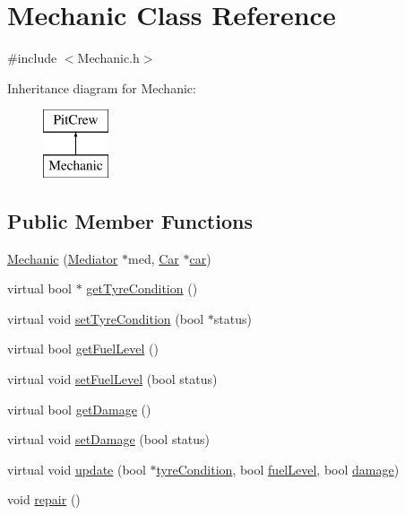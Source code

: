 \hypertarget{class_mechanic}{}\section{Mechanic Class Reference}
\label{class_mechanic}


{\ttfamily \#include $<$Mechanic.\+h$>$}

Inheritance diagram for Mechanic\+:\begin{figure}[H]
\begin{center}
\leavevmode
\includegraphics[height=2.000000cm]{class_mechanic}
\end{center}
\end{figure}
\subsection*{Public Member Functions}
\begin{DoxyCompactItemize}
\item 
\mbox{\hyperlink{class_mechanic_a919f634b4363111e9e17b2c6dd29b9c8}{Mechanic}} (\mbox{\hyperlink{class_mediator}{Mediator}} $\ast$med, \mbox{\hyperlink{class_car}{Car}} $\ast$\mbox{\hyperlink{class_pit_crew_ae2d97d82c1ae7061faf9b053329772e5}{car}})
\item 
virtual bool $\ast$ \mbox{\hyperlink{class_mechanic_aed7f46c76c75b647527c041ff5082f6e}{get\+Tyre\+Condition}} ()
\item 
virtual void \mbox{\hyperlink{class_mechanic_a9ca7c0e50fe3bdc27f9f8f2273968ddc}{set\+Tyre\+Condition}} (bool $\ast$status)
\item 
virtual bool \mbox{\hyperlink{class_mechanic_a0479343f19d2ea34942e3c3bd0b14391}{get\+Fuel\+Level}} ()
\item 
virtual void \mbox{\hyperlink{class_mechanic_aadcc0312af851bd03361aec4744881ee}{set\+Fuel\+Level}} (bool status)
\item 
virtual bool \mbox{\hyperlink{class_mechanic_a6a67e4933d517b8e0a78763d80c82fd8}{get\+Damage}} ()
\item 
virtual void \mbox{\hyperlink{class_mechanic_a12dfbe444cfcd09925534e2651ef5489}{set\+Damage}} (bool status)
\item 
virtual void \mbox{\hyperlink{class_mechanic_a405ddcc5b6e6f0194c33af4972cdec5d}{update}} (bool $\ast$\mbox{\hyperlink{class_pit_crew_add6d2560b553a1359bfb68a6a4d80332}{tyre\+Condition}}, bool \mbox{\hyperlink{class_pit_crew_ad45840fa02b11a128e069ffcc7fdde47}{fuel\+Level}}, bool \mbox{\hyperlink{class_pit_crew_aa87241e1f87a430e1a92ed7010ccf554}{damage}})
\item 
void \mbox{\hyperlink{class_mechanic_a4a7db79a24606239ab4c712a9d743d35}{repair}} ()
\end{DoxyCompactItemize}
